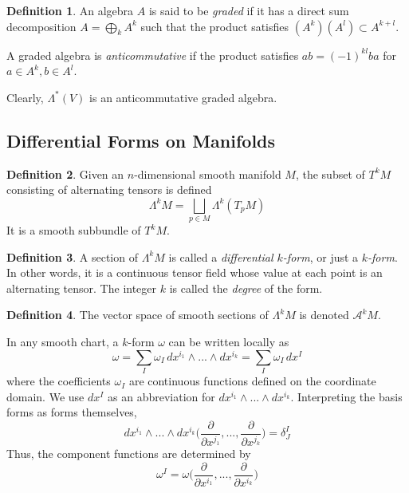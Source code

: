 \documentclass{article}
\theoremstyle{remark}
\theoremstyle{definition}
\newtheorem{definition}{Definition}[section]
\begin{document}
    \begin{definition}
    An algebra $A$ is said to be \textit{graded} if it has a direct sum decomposition $A = \bigoplus_k A^k$ such that the product satisfies $(A^k) (A^l) \subset A^{k+l}$. 

    A graded algebra is \textit{anticommutative} if the product satisfies $ab = (-1)^{kl} ba$ for $a \in A^k, b \in A^l$. 
    \end{definition}

    Clearly, $\Lambda^* (V)$ is an anticommutative graded algebra. 

  \subsection{Differential Forms on Manifolds}

    \begin{definition}
    Given an $n$-dimensional smooth manifold $M$, the subset of $T^k M$ consisting of alternating tensors is defined
    \[\Lambda^k M = \bigsqcup_{p \in M} \Lambda^k (T_p M)\]
    It is a smooth subbundle of $T^k M$. 
    \end{definition}

    \begin{definition}
    A section of $\Lambda^k M$ is called a \textit{differential $k$-form}, or just a \textit{$k$-form}. In other words, it is a continuous tensor field whose value at each point is an alternating tensor. The integer $k$ is called the \textit{degree} of the form. 
    \end{definition}

    \begin{definition}
    The vector space of smooth sections of $\Lambda^k M$ is denoted $\mathcal{A}^k M$. 
    \end{definition}

    In any smooth chart, a $k$-form $\omega$ can be written locally as 
    \[\omega = \sum_I \omega_I \, dx^{i_1} \wedge ... \wedge dx^{i_k} = \sum_I \omega_I \, dx^I\]
    where the coefficients $\omega_I$ are continuous functions defined on the coordinate domain. We use $dx^I$ as an abbreviation for $dx^{i_1} \wedge ... \wedge dx^{i_k}$. Interpreting the basis forms as forms themselves, 
    \[dx^{i_1} \wedge ... \wedge dx^{i_k} \bigg( \frac{\partial}{\partial x^{j_1}}, ..., \frac{\partial}{\partial x^{j_k}} \bigg) = \delta^I_J\]
    Thus, the component functions are determined by
    \[\omega^I = \omega \bigg( \frac{\partial}{\partial x^{i_1}}, ... ,\frac{\partial}{\partial x^{i_k}} \bigg)\]
\end{document}

